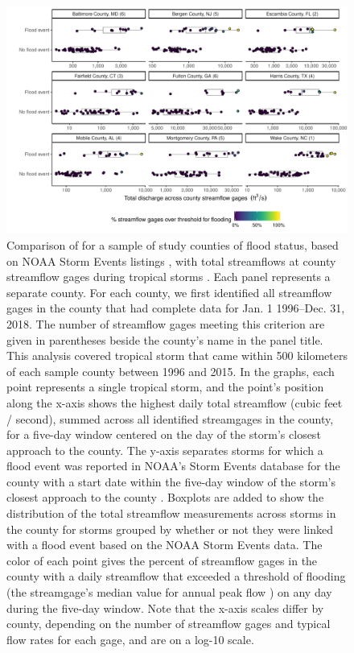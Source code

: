 \documentclass[fleqn,10pt,lineno]{olplainarticle}
\begin{document}
\begin{figure}[tbhp!]
\centering
\includegraphics[width=0.8\linewidth]{figures/floodcomparison}
\caption{Comparison of for a sample of study counties of flood status, based on NOAA Storm Events listings \cite{stormevents, noaastormevents}, with total streamflows at county streamflow gages during tropical storms \cite{usgsgages, countyfloods, dataRetrieval}. Each panel represents a separate county. For each county, we first identified all streamflow gages in the county that had complete data for Jan. 1 1996--Dec. 31, 2018. The number of streamflow gages meeting this criterion are given in parentheses beside the county's name in the panel title. This analysis covered tropical storm that came within 500 kilometers of each sample county between 1996 and 2015. In the graphs, each point represents a single tropical storm, and the point's position along the x-axis shows the highest daily total streamflow (cubic feet / second), summed across all identified streamgages in the county, for a five-day window centered on the day of the storm's closest approach to the county. The y-axis separates storms for which a flood event was reported in NOAA's Storm Events database for the county with a start date within the five-day window of the storm's closest approach to the county \cite{stormevents, noaastormevents}. Boxplots are added to show the distribution of the total streamflow measurements across storms in the county for storms grouped by whether or not they were linked with a flood event based on the NOAA Storm Events data. The color of each point gives the percent of streamflow gages in the county with a daily streamflow that exceeded a threshold of flooding (the streamgage's median value for annual peak flow \cite{countyfloods}) on any day during the five-day window.  Note that the x-axis scales differ by county, depending on the number of streamflow gages and typical flow rates for each gage, and are on a log-10 scale.}
\label{fig:floodcomparison}
\end{figure}
\end{document}
